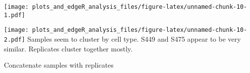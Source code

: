 \documentclass[]{article}
\newenvironment{Shaded}{\begin{snugshade}}{\end{snugshade}}
\newcommand{\KeywordTok}[1]{\textcolor[rgb]{0.13,0.29,0.53}{\textbf{#1}}}
\newcommand{\DataTypeTok}[1]{\textcolor[rgb]{0.13,0.29,0.53}{#1}}
\newcommand{\DecValTok}[1]{\textcolor[rgb]{0.00,0.00,0.81}{#1}}
\newcommand{\StringTok}[1]{\textcolor[rgb]{0.31,0.60,0.02}{#1}}
\newcommand{\CommentTok}[1]{\textcolor[rgb]{0.56,0.35,0.01}{\textit{#1}}}
\newcommand{\OperatorTok}[1]{\textcolor[rgb]{0.81,0.36,0.00}{\textbf{#1}}}
\newcommand{\NormalTok}[1]{#1}
\begin{document}
\texttt{[image: plots\_and\_edgeR\_analysis\_files/figure-latex/unnamed-chunk-10-1.pdf]}

\begin{Shaded}
\end{Shaded}

\texttt{[image: plots\_and\_edgeR\_analysis\_files/figure-latex/unnamed-chunk-10-2.pdf]}
Samples seem to cluster by cell type. S449 and S475 appear to be very
similar. Replicates cluster together mostly.

Concatenate samples with replicates
\end{document}
